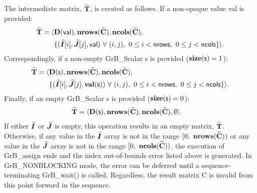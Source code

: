 {\color{red}
The intermediate matrix, ${\bf \widetilde{T}}$, is created as follows. If a non-opaque value {\sf val} is provided:
\[
\begin{aligned}
{\bf \widetilde{T}} = \langle & \bold{D}({\sf val}),
                           \bold{nrows}({\bf \widetilde{C}}), 
                           \bold{ncols}({\bf \widetilde{C}}), \\
 & \{ (\bm{\widetilde{I}}[i],\bm{\widetilde{J}}[j], {\sf val})
\ \forall \ (i,j), \ 0 \leq i < {\sf nrows}, \ 0 \leq j < {\sf ncols} \} \rangle. 
\end{aligned}
\]
Correspondingly, if a non-empty {\sf GrB\_Scalar} {\sf s} is provided ($\mathbf{size}({\sf s}) = 1$):
\[
\begin{aligned}
{\bf \widetilde{T}} = \langle & \bold{D}({\sf s}),
                           \bold{nrows}({\bf \widetilde{C}}), 
                           \bold{ncols}({\bf \widetilde{C}}), \\
    & \{ (\bm{\widetilde{I}}[i],\bm{\widetilde{J}}[j], \mathbf{val}({\sf s}))
\ \forall \ (i,j), \ 0 \leq i < {\sf nrows}, \ 0 \leq j < {\sf ncols} \} \rangle. 
\end{aligned}
\]
Finally, if an empty {\sf GrB\_Scalar} {\sf s} is provided ($\mathbf{size}({\sf s}) = 0$):
\[
\begin{aligned}
{\bf \widetilde{T}} = \langle & \bold{D}({\sf s}),
                           \bold{nrows}({\bf \widetilde{C}}), 
                           \bold{ncols}({\bf \widetilde{C}}), \emptyset \rangle. 
\end{aligned}
\]
}
If either $\bm{\widetilde{I}}$ or $\bm{\widetilde{J}}$ is empty, this 
operation results in an empty matrix, ${\bf \widetilde{T}}$.  Otherwise, if 
any value in the $\bm{\widetilde{I}}$ array is not in
the range $[0,\ \bold{nrows}(\matrix{\widetilde{C}}) )$ or any value in the 
$\bm{\widetilde{J}}$ array is not in the range 
$[0,\ \bold{ncols}(\matrix{\widetilde{C}}))$, the execution of {\sf GrB\_assign} 
ends and the index out-of-bounds error listed above is generated.  In 
{\sf GrB\_NONBLOCKING} mode, the error can be deferred until a 
sequence-terminating {\sf GrB\_wait()} is called.  Regardless, the result 
matrix {\sf C} is invalid from this point forward in the sequence.

